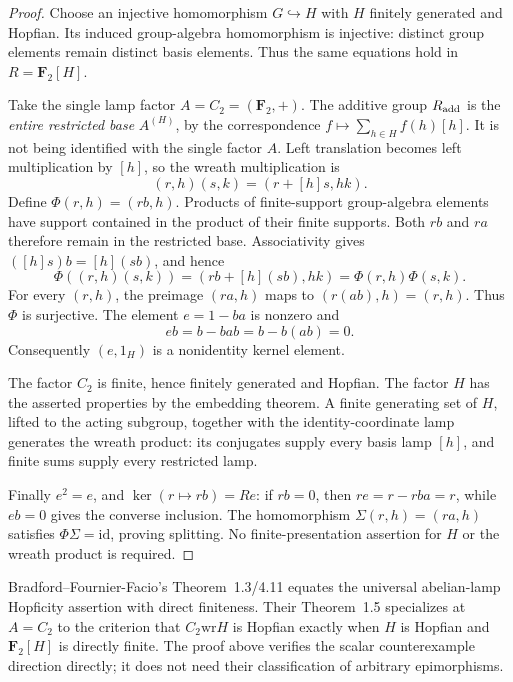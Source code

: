 \documentclass[11pt]{article}
\newcommand{\F}{\mathbf F}
\newcommand{\wrp}{\mathbin{\mathrm{wr}}}
\begin{document}
\begin{proof}
Choose an injective homomorphism $G\hookrightarrow H$ with $H$ finitely generated and Hopfian. Its induced group-algebra homomorphism is injective: distinct group elements remain distinct basis elements. Thus the same equations hold in $R=\F_2[H]$.

Take the single lamp factor $A=C_2=(\F_2,+)$. The additive group $R_{\rm add}$ is the \emph{entire restricted base} $A^{(H)}$, by the correspondence $f\mapsto\sum_{h\in H}f(h)[h]$. It is not being identified with the single factor $A$. Left translation becomes left multiplication by $[h]$, so the wreath multiplication is
\[
 (r,h)(s,k)=(r+[h]s,hk).
\]
Define $\Phi(r,h)=(rb,h)$. Products of finite-support group-algebra elements have support contained in the product of their finite supports. Both $rb$ and $ra$ therefore remain in the restricted base. Associativity gives $([h]s)b=[h](sb)$, and hence
\[
 \Phi((r,h)(s,k))=(rb+[h](sb),hk)
 =\Phi(r,h)\Phi(s,k).
\]
For every $(r,h)$, the preimage $(ra,h)$ maps to $(r(ab),h)=(r,h)$. Thus $\Phi$ is surjective. The element $e=1-ba$ is nonzero and
\[
 eb=b-bab=b-b(ab)=0.
\]
Consequently $(e,1_H)$ is a nonidentity kernel element.

The factor $C_2$ is finite, hence finitely generated and Hopfian. The factor $H$ has the asserted properties by the embedding theorem. A finite generating set of $H$, lifted to the acting subgroup, together with the identity-coordinate lamp generates the wreath product: its conjugates supply every basis lamp $[h]$, and finite sums supply every restricted lamp.

Finally $e^2=e$, and $\ker(r\mapsto rb)=Re$: if $rb=0$, then $re=r-rba=r$, while $eb=0$ gives the converse inclusion. The homomorphism $\Sigma(r,h)=(ra,h)$ satisfies $\Phi\Sigma=\mathrm{id}$, proving splitting. No finite-presentation assertion for $H$ or the wreath product is required.
\end{proof}

Bradford--Fournier-Facio's Theorem~1.3/4.11 equates the universal abelian-lamp Hopficity assertion with direct finiteness. Their Theorem~1.5 specializes at $A=C_2$ to the criterion that $C_2\wrp H$ is Hopfian exactly when $H$ is Hopfian and $\F_2[H]$ is directly finite. The proof above verifies the scalar counterexample direction directly; it does not need their classification of arbitrary epimorphisms.
\end{document}
